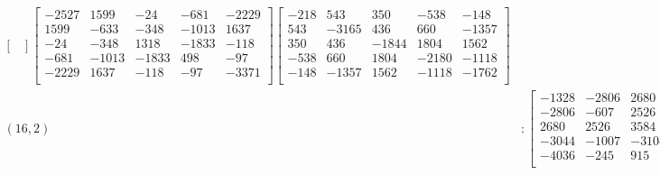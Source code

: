 \documentclass[12pt]{amsart}
\theoremstyle{plain}
\theoremstyle{definition}
\begin{document}
\begin{landscape}
\begin{align*}
\begin{bmatrix}
\end{bmatrix}
\begin{bmatrix}
-2527  &   1599  &   -24  &   -681  &   -2229  \\ 
 1599  &   -633  &   -348  &   -1013  &   1637  \\ 
 -24  &   -348  &   1318  &   -1833  &   -118  \\ 
 -681  &   -1013  &   -1833  &   498  &   -97  \\ 
 -2229  &   1637  &   -118  &   -97  &   -3371  \\ 
\end{bmatrix}
\begin{bmatrix}
-218  &   543  &   350  &   -538  &   -148  \\ 
 543  &   -3165  &   436  &   660  &   -1357  \\ 
 350  &   436  &   -1844  &   1804  &   1562  \\ 
 -538  &   660  &   1804  &   -2180  &   -1118  \\ 
 -148  &   -1357  &   1562  &   -1118  &   -1762  \\ 
\end{bmatrix}
\\
(16,2) &:
\begin{bmatrix}
-1328  &   -2806  &   2680  &   -3044  &   -4036  \\ 
 -2806  &   -607  &   2526  &   -1007  &   -245  \\ 
 2680  &   2526  &   3584  &   -3104  &   915  \\ 
 -3044  &   -1007  &   -3104  &   2656  &   3763  \\ 
 -4036  &   -245  &   915  &   3763  &   1744  \\ 
\end{bmatrix}
\begin{bmatrix}
-6621  &   191  &   3484  &   -5719  &   -5252  \\ 
 191  &   -5181  &   2021  &   747  &   -828  \\ 
 3484  &   2021  &   4410  &   -17  &   -881  \\ 
 -5719  &   747  &   -17  &   86  &   3863  \\ 
 -5252  &   -828  &   -881  &   3863  &   1275  \\ 
\end{bmatrix}
\begin{bmatrix}
-2447  &   -2723  &   4194  &   -4339  &   -2004  \\ 
 -2723  &   -837  &   764  &   171  &   404  \\ 

\end{bmatrix}
\end{align*}
\end{landscape}
\end{document}
